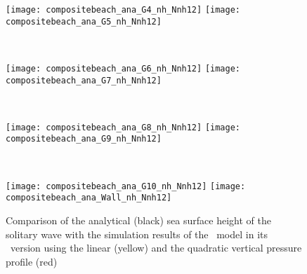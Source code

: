 \begin{figure}[htbp]
\begin{minipage}{\textwidth}
\texttt{[image: compositebeach\_ana\_G4\_nh\_Nnh12]}
\texttt{[image: compositebeach\_ana\_G5\_nh\_Nnh12]}
\end{minipage} \\
\begin{minipage}{\textwidth}
\texttt{[image: compositebeach\_ana\_G6\_nh\_Nnh12]}
\texttt{[image: compositebeach\_ana\_G7\_nh\_Nnh12]}
\end{minipage} \\
\begin{minipage}{\textwidth}
\texttt{[image: compositebeach\_ana\_G8\_nh\_Nnh12]}
\texttt{[image: compositebeach\_ana\_G9\_nh\_Nnh12]}
\end{minipage} \\
\begin{minipage}{\textwidth}
\texttt{[image: compositebeach\_ana\_G10\_nh\_Nnh12]}
\texttt{[image: compositebeach\_ana\_Wall\_nh\_Nnh12]}
\end{minipage}
\caption{Comparison of the analytical (black) sea surface height of the
solitary wave with the simulation results of the \nh\ model in its \nh\ version using the linear (yellow) and the quadratic vertical pressure profile (red)}
\label{fig:nh_compositebeach_ana_nh_Nnh12}
\end{figure}

